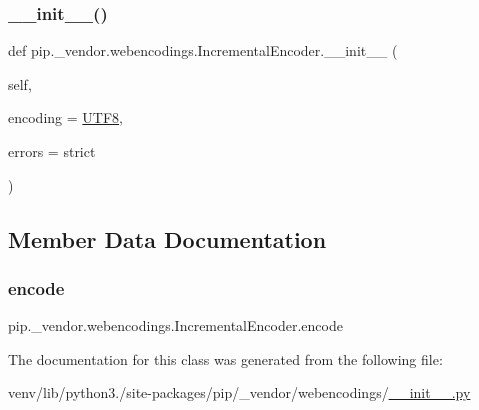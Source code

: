 \subsubsection{\texorpdfstring{\+\_\+\+\_\+init\+\_\+\+\_\+()}{\_\_init\_\_()}}
{\footnotesize\ttfamily def pip.\+\_\+vendor.\+webencodings.\+Incremental\+Encoder.\+\_\+\+\_\+init\+\_\+\+\_\+ (\begin{DoxyParamCaption}\item[{}]{self,  }\item[{}]{encoding = {\ttfamily \hyperlink{namespacepip_1_1__vendor_1_1webencodings_a2eb014d3f6305ba50ece3cad231b60bf}{U\+T\+F8}},  }\item[{}]{errors = {\ttfamily \textquotesingle{}strict\textquotesingle{}} }\end{DoxyParamCaption})}



\subsection{Member Data Documentation}
\mbox{\label{classpip_1_1__vendor_1_1webencodings_1_1IncrementalEncoder_a65e186cdfa8a858b97fc12072baba99e}} 
\subsubsection{\texorpdfstring{encode}{encode}}
{\footnotesize\ttfamily pip.\+\_\+vendor.\+webencodings.\+Incremental\+Encoder.\+encode}



The documentation for this class was generated from the following file\+:\begin{DoxyCompactItemize}
\item 
venv/lib/python3./site-\/packages/pip/\+\_\+vendor/webencodings/\hyperlink{venv_2lib_2python3_89_2site-packages_2pip_2__vendor_2webencodings_2____init_____8py}{\+\_\+\+\_\+init\+\_\+\+\_\+.\+py}\end{DoxyCompactItemize}
